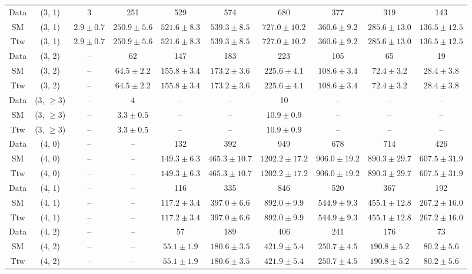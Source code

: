 \begin{table}[h!]
{\begin{tabular}{cccccccccc}
	Data & (3, 1) & 3 & 251 & 529 & 574 & 680 & 377 & 319 & 143 \\[0.5ex] 
	SM & (3, 1) & $2.9\pm 0.7$ & $250.9\pm 5.6$ & $521.6\pm 8.3$ & $539.3\pm 8.5$ & $727.0\pm 10.2$ & $360.6\pm 9.2$ & $285.6\pm 13.0$ & $136.5\pm 12.5$ \\[0.5ex] 
	Ttw & (3, 1) & $2.9\pm 0.7$ & $250.9\pm 5.6$ & $521.6\pm 8.3$ & $539.3\pm 8.5$ & $727.0\pm 10.2$ & $360.6\pm 9.2$ & $285.6\pm 13.0$ & $136.5\pm 12.5$ \\[0.5ex] 
	Data & (3, 2) & -- & 62 & 147 & 183 & 223 & 105 & 65 & 19 \\[0.5ex] 
	SM & (3, 2) & -- & $64.5\pm 2.2$ & $155.8\pm 3.4$ & $173.2\pm 3.6$ & $225.6\pm 4.1$ & $108.6\pm 3.4$ & $72.4\pm 3.2$ & $28.4\pm 3.8$ \\[0.5ex] 
	Ttw & (3, 2) & -- & $64.5\pm 2.2$ & $155.8\pm 3.4$ & $173.2\pm 3.6$ & $225.6\pm 4.1$ & $108.6\pm 3.4$ & $72.4\pm 3.2$ & $28.4\pm 3.8$ \\[0.5ex] 
	Data & (3, $\ge3$) & -- & 4 & -- & -- & 10 & -- & -- & -- \\[0.5ex] 
	SM & (3, $\ge3$) & -- & $3.3\pm 0.5$ & -- & -- & $10.9\pm 0.9$ & -- & -- & -- \\[0.5ex] 
	Ttw & (3, $\ge3$) & -- & $3.3\pm 0.5$ & -- & -- & $10.9\pm 0.9$ & -- & -- & -- \\[0.5ex] 
	Data & (4, 0) & -- & -- & 132 & 392 & 949 & 678 & 714 & 426 \\[0.5ex] 
	SM & (4, 0) & -- & -- & $149.3\pm 6.3$ & $465.3\pm 10.7$ & $1202.2\pm 17.2$ & $906.0\pm 19.2$ & $890.3\pm 29.7$ & $607.5\pm 31.9$ \\[0.5ex] 
	Ttw & (4, 0) & -- & -- & $149.3\pm 6.3$ & $465.3\pm 10.7$ & $1202.2\pm 17.2$ & $906.0\pm 19.2$ & $890.3\pm 29.7$ & $607.5\pm 31.9$ \\[0.5ex] 
	Data & (4, 1) & -- & -- & 116 & 335 & 846 & 520 & 367 & 192 \\[0.5ex] 
	SM & (4, 1) & -- & -- & $117.2\pm 3.4$ & $397.0\pm 6.6$ & $892.0\pm 9.9$ & $544.9\pm 9.3$ & $455.1\pm 12.8$ & $267.2\pm 16.0$ \\[0.5ex] 
	Ttw & (4, 1) & -- & -- & $117.2\pm 3.4$ & $397.0\pm 6.6$ & $892.0\pm 9.9$ & $544.9\pm 9.3$ & $455.1\pm 12.8$ & $267.2\pm 16.0$ \\[0.5ex] 
	Data & (4, 2) & -- & -- & 57 & 189 & 406 & 241 & 176 & 73 \\[0.5ex] 
	SM & (4, 2) & -- & -- & $55.1\pm 1.9$ & $180.6\pm 3.5$ & $421.9\pm 5.4$ & $250.7\pm 4.5$ & $190.8\pm 5.2$ & $80.2\pm 5.6$ \\[0.5ex] 
	Ttw & (4, 2) & -- & -- & $55.1\pm 1.9$ & $180.6\pm 3.5$ & $421.9\pm 5.4$ & $250.7\pm 4.5$ & $190.8\pm 5.2$ & $80.2\pm 5.6$ \\[0.5ex] 

\end{tabular}}
\end{table}

